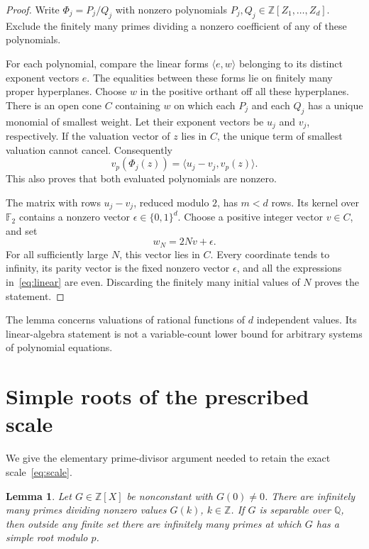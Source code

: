 \documentclass[11pt,a4paper]{article}
\newtheorem{lemma}[theorem]{Lemma}
\theoremstyle{remark}\newtheorem{remark}[theorem]{Remark}
\newcommand{\Q}{\mathbb Q}\newcommand{\Z}{\mathbb Z}
\newcommand{\F}{\mathbb F}
\begin{document}
\begin{proof}
Write \(\Phi_j=P_j/Q_j\) with nonzero polynomials
\(P_j,Q_j\in\Z[Z_1,\ldots,Z_d]\).
Exclude the finitely many primes dividing a nonzero coefficient
of any of these polynomials.

For each polynomial, compare the linear forms
\(\langle e,w\rangle\) belonging to its distinct exponent vectors
\(e\). The equalities between these forms lie on finitely many
proper hyperplanes. Choose \(w\) in the positive orthant off all
these hyperplanes. There is an open cone \(C\) containing \(w\)
on which each \(P_j\) and each \(Q_j\) has a unique monomial of
smallest weight. Let their exponent vectors be \(u_j\) and
\(v_j\), respectively. If the valuation vector of \(z\) lies in
\(C\), the unique term of smallest valuation cannot cancel.
Consequently
\begin{equation}\label{eq:linear}
         v_p(\Phi_j(z))=\langle u_j-v_j,v_p(z)\rangle.
\end{equation}
This also proves that both evaluated polynomials are nonzero.

The matrix with rows \(u_j-v_j\), reduced modulo \(2\), has
\(m<d\) rows. Its kernel over \(\F_2\) contains a nonzero vector
\(\epsilon\in\{0,1\}^d\).
Choose a positive integer vector \(v\in C\), and set
\[
                         w_N=2Nv+\epsilon .
\]
For all sufficiently large \(N\), this vector lies in \(C\).
Every coordinate tends to infinity, its parity vector is the
fixed nonzero vector \(\epsilon\), and all the expressions
in~\eqref{eq:linear} are even. Discarding the finitely many initial
values of \(N\) proves the statement.
\end{proof}

The lemma concerns valuations of rational functions of \(d\)
independent values. Its linear-algebra statement is not a
variable-count lower bound for arbitrary systems of polynomial
equations.

\section{Simple roots of the prescribed scale}

We give the elementary prime-divisor argument needed to retain
the exact scale~\eqref{eq:scale}.

\begin{lemma}\label{lem:primevalues}
Let \(G\in\Z[X]\) be nonconstant with \(G(0)\ne0\).
There are infinitely many primes dividing nonzero values \(G(k)\),
\(k\in\Z\).
If \(G\) is separable over \(\Q\), then outside any finite set
there are infinitely many primes at which \(G\) has a simple
root modulo \(p\).
\end{lemma}
\end{document}
